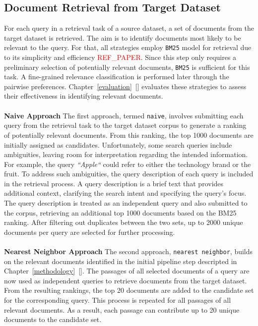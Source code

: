 \subsection{Document Retrieval from Target Dataset}\label{document-retrieval-from-target-dataset}

For each query in a retrieval task of a source dataset, a set of documents from the target dataset is retrieved. The aim is to identify documents most likely to be relevant to the query. For that, all strategies employ \texttt{BM25} model for retrieval due to its simplicity and efficiency \textcolor{red}{REF\_PAPER}. Since this step only requires a preliminary selection of potentially relevant documents, \texttt{BM25} is sufficient for this task. A fine-grained relevance classification is performed later through the pairwise preferences. Chapter~\ref{evaluation}~[] evaluates these strategies to assess their effectiveness in identifying relevant documents.
\\\\
\textbf{Naive Approach}
The first approach, termed \texttt{naive}, involves submitting each query from the retrieval task to the target dataset corpus to generate a ranking of potentially relevant documents. From this ranking, the top 1000 documents are initially assigned as candidates. Unfortunately, some search queries include ambiguities, leaving room for interpretation regarding the intended information. For example, the query \textit{``Apple``} could refer to either the technology brand or the fruit. To address such ambiguities, the query description of each query is included in the retrieval process. A query description is a brief text that provides additional context, clarifying the search intent and specifying the query's focus. The query description is treated as an independent query and also submitted to the corpus, retrieving an additional top 1000 documents based on the BM25 ranking. After filtering out duplicates between the two sets, up to 2000 unique documents per query are selected for further processing.
\\\\
\textbf{Nearest Neighbor Approach}
The second approach, \texttt{nearest neighbor}, builds on the relevant documents identified in the initial pipeline step descripted in Chapter~\ref{methodology}~[]. The passages of all selected documents of a query are now used as independent queries to retrieve documents from the target dataset. From the resulting rankings, the top 20 documents are added to the candidate set for the corresponding query. This process is repeated for all passages of all relevant documents. As a result, each passage can contribute up to 20 unique documents to the candidate set.
